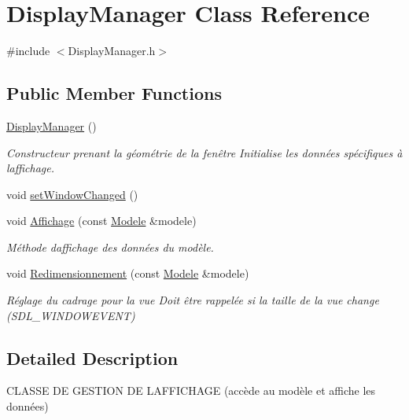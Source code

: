 \hypertarget{classDisplayManager}{}\section{Display\+Manager Class Reference}
\label{classDisplayManager}


{\ttfamily \#include $<$Display\+Manager.\+h$>$}

\subsection*{Public Member Functions}
\begin{DoxyCompactItemize}
\item 
\mbox{\label{classDisplayManager_aaa4cbf192d2e50fde0064472243558e9}} 
\mbox{\hyperlink{classDisplayManager_aaa4cbf192d2e50fde0064472243558e9}{Display\+Manager}} ()
\begin{DoxyCompactList}\small\item\em Constructeur prenant la géométrie de la fenêtre Initialise les données spécifiques à l\textquotesingle{}affichage. \end{DoxyCompactList}\item 
void \mbox{\hyperlink{classDisplayManager_aeb02e2085482d02cf042b4ed9266f65d}{set\+Window\+Changed}} ()
\item 
void \mbox{\hyperlink{classDisplayManager_ac0243afb77d3ff3d20f7504fc91c66df}{Affichage}} (const \mbox{\hyperlink{classModele}{Modele}} \&modele)
\begin{DoxyCompactList}\small\item\em Méthode d\textquotesingle{}affichage des données du modèle. \end{DoxyCompactList}\item 
void \mbox{\hyperlink{classDisplayManager_a6043a48cbb0d711752adbef4797fcb21}{Redimensionnement}} (const \mbox{\hyperlink{classModele}{Modele}} \&modele)
\begin{DoxyCompactList}\small\item\em Réglage du cadrage pour la vue Doit être rappelée si la taille de la vue change (S\+D\+L\+\_\+\+W\+I\+N\+D\+O\+W\+E\+V\+E\+NT) \end{DoxyCompactList}\end{DoxyCompactItemize}


\subsection{Detailed Description}
C\+L\+A\+S\+SE DE G\+E\+S\+T\+I\+ON DE L\textquotesingle{}A\+F\+F\+I\+C\+H\+A\+GE (accède au modèle et affiche les données) 

